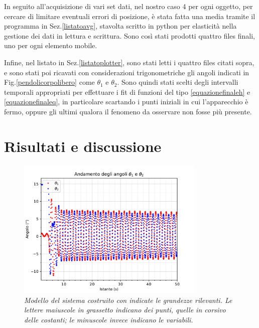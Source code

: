 \documentclass[11pt, a4paper, twoside]{article}
\begin{document}
In seguito all'acquisizione di vari set dati, nel nostro caso 4 per ogni oggetto,
per cercare di limitare eventuali errori di posizione, è stata fatta 
una media tramite il programma in Sez.\ref{listatoavg}, stavolta scritto
in python per elasticità nella gestione dei dati in lettura e scrittura.
Sono così stati prodotti quattro files finali, uno per ogni elemento mobile.

Infine, nel listato in Sez.\ref{listatoplotter}, sono stati letti i quattro
files citati sopra, e sono stati poi ricavati con considerazioni
trigonometriche gli angoli indicati in Fig.\ref{pendolicorpolibero} come
$\theta_1$ e $\theta_2$. Sono quindi stati scelti degli intervalli 
temporali appropriati per effettuare i fit di funzioni del tipo \ref{equazionefinaleh} e 
\ref{equazionefinaleq}, in particolare scartando 
i punti iniziali in cui l'apparecchio è fermo, oppure gli ultimi 
qualora il fenomeno da osservare non fosse più presente.

\section{Risultati e discussione}

\begin{figure}[h!]
  \centering
  \includegraphics[width=0.8\textwidth]{../../media/plot/angles_full.pdf}
  \caption{\textit{Modello del sistema costruito con indicate
   le grandezze rilevanti. Le lettere maiuscole in grassetto indicano dei punti, quelle in corsivo delle 
   costanti; le minuscole invece indicano le variabili.} }
  \label{angles_full}
\end{figure}
\end{document}
